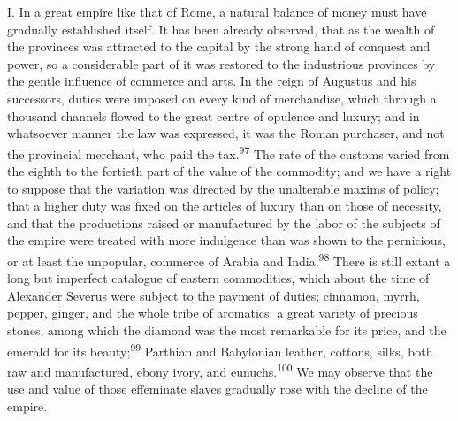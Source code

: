 I. In a great empire like that of Rome, a natural balance of
money must have gradually established itself. It has been already
observed, that as the wealth of the provinces was attracted to
the capital by the strong hand of conquest and power, so a
considerable part of it was restored to the industrious provinces
by the gentle influence of commerce and arts. In the reign of
Augustus and his successors, duties were imposed on every kind of
merchandise, which through a thousand channels flowed to the
great centre of opulence and luxury; and in whatsoever manner the
law was expressed, it was the Roman purchaser, and not the
provincial merchant, who paid the tax.\textsuperscript{97} The rate of the customs
varied from the eighth to the fortieth part of the value of the
commodity; and we have a right to suppose that the variation was
directed by the unalterable maxims of policy; that a higher duty
was fixed on the articles of luxury than on those of necessity,
and that the productions raised or manufactured by the labor of
the subjects of the empire were treated with more indulgence than
was shown to the pernicious, or at least the unpopular, commerce
of Arabia and India.\textsuperscript{98} There is still extant a long but
imperfect catalogue of eastern commodities, which about the time
of Alexander Severus were subject to the payment of duties;
cinnamon, myrrh, pepper, ginger, and the whole tribe of
aromatics; a great variety of precious stones, among which the
diamond was the most remarkable for its price, and the emerald
for its beauty;\textsuperscript{99} Parthian and Babylonian leather, cottons,
silks, both raw and manufactured, ebony ivory, and eunuchs.\textsuperscript{100}
We may observe that the use and value of those effeminate slaves
gradually rose with the decline of the empire.




